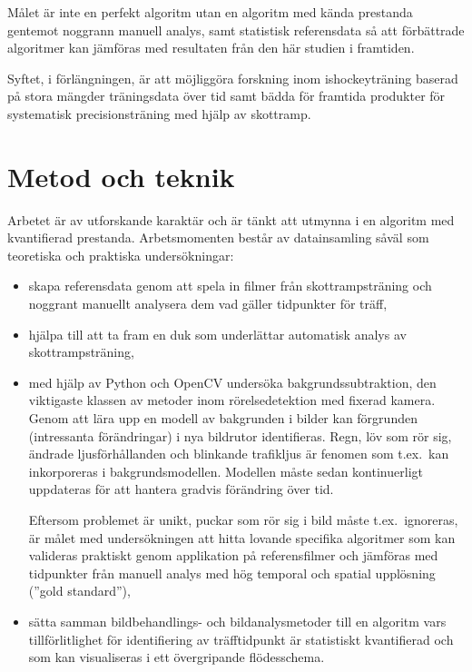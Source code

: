 \documentclass[a4paper,12pt]{article}
\begin{document}
Målet är inte en perfekt algoritm utan en algoritm med kända prestanda
gentemot noggrann manuell analys, samt statistisk referensdata så att
förbättrade algoritmer kan jämföras med resultaten från den här studien i
framtiden.

Syftet, i förlängningen, är att möjliggöra forskning inom ishockeyträning
baserad på stora mängder träningsdata över tid samt bädda för framtida
produkter för systematisk precisionsträning med hjälp av skottramp.


\section*{Metod och teknik}
Arbetet är av utforskande karaktär och är tänkt att utmynna i en algoritm
med kvantifierad prestanda. Arbetsmomenten består av datainsamling såväl
som teoretiska och praktiska undersökningar:

\begin{itemize}
  \item skapa referensdata genom att spela in filmer från skottrampsträning
    och noggrant manuellt analysera dem vad gäller tidpunkter för träff,
  \item hjälpa till att ta fram en duk som underlättar automatisk analys av
    skottrampsträning,
  \item med hjälp av Python och OpenCV undersöka bakgrundssubtraktion, den
    viktigaste klassen av metoder inom rörelsedetektion med fixerad kamera.
    Genom att lära upp en modell av bakgrunden i bilder kan förgrunden
    (intressanta förändringar) i nya bildrutor identifieras. Regn, löv som
    rör sig, ändrade ljusförhållanden och blinkande trafikljus är fenomen som
    t.ex.\ kan inkorporeras i bakgrundsmodellen. Modellen måste sedan
    kontinuerligt uppdateras för att hantera gradvis förändring över tid.

    Eftersom problemet är unikt, puckar som rör sig i bild måste t.ex.\
    ignoreras, är målet med undersökningen att hitta lovande specifika
    algoritmer som kan valideras praktiskt genom applikation på referensfilmer
    och jämföras med tidpunkter från manuell analys med hög temporal och
    spatial upplösning (''gold standard''),
  \item sätta samman bildbehandlings- och bildanalysmetoder till en algoritm
    vars tillförlitlighet för identifiering av träfftidpunkt är statistiskt
    kvantifierad och som kan visualiseras i ett övergripande flödesschema.
\end{itemize}
\end{document}
